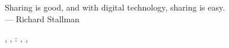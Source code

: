 \thispagestyle{empty}
{}

\vspace*{3cm}

\begin{center}
    Sharing is good, and with digital technology, sharing is easy. \\ \medskip
    --- Richard Stallman
\end{center}

\medskip

\hfill

\vfill

\noindent\myNameOne, \myNameTwo, \myNameThree: \textit{\myTitle,} \myDegree,
\textcopyright\ \myTime


